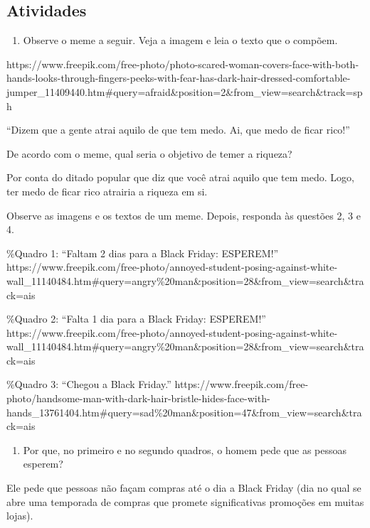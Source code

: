 \begin{itemize}
\begin{itemize}
\section{Atividades}

\begin{enumerate}
\def\labelenumi{\arabic{enumi}.}
\tightlist
\item
  Observe o meme a seguir. Veja a imagem e leia o texto que o compõem.
\end{enumerate}

https://www.freepik.com/free-photo/photo-scared-woman-covers-face-with-both-hands-looks-through-fingers-peeks-with-fear-has-dark-hair-dressed-comfortable-jumper\_11409440.htm\#query=afraid\&position=2\&from\_view=search\&track=sph

``Dizem que a gente atrai aquilo de que tem medo. Ai, que medo de ficar
rico!''

De acordo com o meme, qual seria o objetivo de temer a riqueza?


Por conta do ditado popular que diz que você atrai aquilo que tem medo.
Logo, ter medo de ficar rico atrairia a riqueza em si.

Observe as imagens e os textos de um meme. Depois, responda às questões
2, 3 e 4.

\%Quadro 1: ``Faltam 2 dias para a Black Friday: ESPEREM!''
https://www.freepik.com/free-photo/annoyed-student-posing-against-white-wall\_11140484.htm\#query=angry\%20man\&position=28\&from\_view=search\&track=ais

\%Quadro 2: ``Falta 1 dia para a Black Friday: ESPEREM!''
https://www.freepik.com/free-photo/annoyed-student-posing-against-white-wall\_11140484.htm\#query=angry\%20man\&position=28\&from\_view=search\&track=ais

\%Quadro 3: ``Chegou a Black Friday.''
https://www.freepik.com/free-photo/handsome-man-with-dark-hair-bristle-hides-face-with-hands\_13761404.htm\#query=sad\%20man\&position=47\&from\_view=search\&track=ais

\begin{enumerate}
\def\labelenumi{\arabic{enumi}.}
\setcounter{enumi}{1}
\tightlist
\item
  Por que, no primeiro e no segundo quadros, o homem pede que as pessoas
  esperem?
\end{enumerate}


Ele pede que pessoas não façam compras até o dia a Black Friday (dia no
qual se abre uma temporada de compras que promete significativas
promoções em muitas lojas).


\end{itemize}
\end{itemize}
